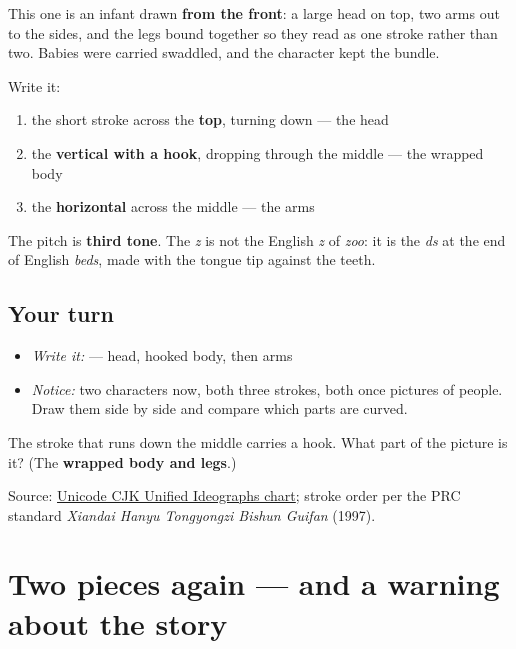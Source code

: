 This one is an infant drawn \textbf{from the front}: a large head on top, two arms out to the sides, and the legs bound together so they read as one stroke rather than two. Babies were carried swaddled, and the character kept the bundle.

Write it:

\begin{enumerate}
\raggedright
  \item the short stroke across the \textbf{top}, turning down — the head
  \item the \textbf{vertical with a hook}, dropping through the middle — the wrapped body
  \item the \textbf{horizontal} across the middle — the arms
\end{enumerate}

The pitch is \textbf{third tone}. The \emph{z} is not the English \emph{z} of \emph{zoo}: it is the \emph{ds} at the end of English \emph{beds}, made with the tongue tip against the teeth.

\subsection*{Your turn}
\begin{itemize}
\raggedright
  \item \emph{Write it:}  — head, hooked body, then arms
  \item \emph{Notice:} two characters now, both three strokes, both once pictures of people. Draw them side by side and compare which parts are curved.
\end{itemize}

\begin{tcolorbox}[breakable,colback=teal!4,colframe=teal!35!black,title={Before you move on}]
The stroke that runs down the middle carries a hook. What part of the picture is it? (The \textbf{wrapped body and legs}.)

Source: \href{https://www.unicode.org/charts/PDF/U4E00.pdf}{Unicode CJK Unified Ideographs chart}; stroke order per the PRC standard \emph{Xiandai Hanyu Tongyongzi Bishun Guifan} (1997).
\end{tcolorbox}
\section[\texorpdfstring{\zh{好} (hǎo)}{好 (hǎo)}]{Two pieces again — and a warning about the story}

\label{lesson:ZH-W01-hao-build}



